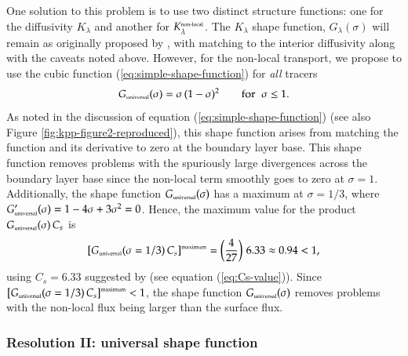 One solution to this problem is to use two distinct structure
functions: one for the diffusivity $K_{\lambda}$ and another for
$K^{\mbox{\tiny non-local}}_{\lambda}$.  The $K_{\lambda}$ shape
function, $G_{\lambda}(\sigma)$ will remain as originally proposed by
\cite{LargeKPP}, with matching to the interior diffusivity along with
the caveats noted above.  However, for the non-local transport, we
propose to use the cubic function (\ref{eq:simple-shape-function}) for
{\it all} tracers
\begin{equation}
G_{\mbox{\tiny universal}}(\sigma)= \sigma \, (1-\sigma)^{2}   \qquad \mbox{for} \; \; \sigma \le 1. 
\label{eq:universal-non-local-structure}
\end{equation}
As noted in the discussion of equation
(\ref{eq:simple-shape-function}) (see also Figure
\ref{fig:kpp-figure2-reproduced}), this shape function arises from
matching the function and its derivative to zero at the boundary layer
base.  This shape function removes problems with the spuriously large
divergences across the boundary layer base since the non-local term
smoothly goes to zero at $\sigma =1$.  Additionally, the shape
function $G_{\mbox{\tiny universal}}(\sigma)$ has a maximum at $\sigma
= 1/3$, where $G_{\mbox{\tiny universal}}'(\sigma) = 1 -4\sigma +
3\sigma^2 = 0$.  Hence, the maximum value for the product
$G_{\mbox{\tiny universal}}(\sigma) \, C_{s}$ is
\begin{equation}
 \left[ G_{\mbox{\tiny universal}}(\sigma=1/3) \, C_{s} \right]^{\mbox{\tiny maximum}} =  \left( \frac{4}{27}  \right) \, 6.33 \approx 0.94 < 1, 
\end{equation}
using $C_{s} = 6.33$ suggested by \cite{LargeKPP} (see equation
(\ref{eq:Cs-value})).  Since $\left[ G_{\mbox{\tiny
      universal}}(\sigma=1/3) \, C_{s} \right]^{\mbox{\tiny maximum}}
< 1$, the shape function $G_{\mbox{\tiny universal}}(\sigma)$ removes
problems with the non-local flux being larger than the surface flux.


\subsubsection{Resolution II: universal shape function}

